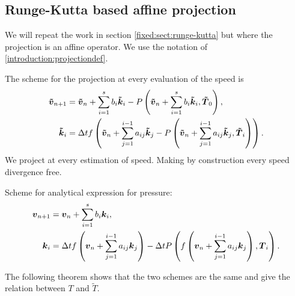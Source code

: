 \subsection{Runge-Kutta based affine projection}
\label{fixed:sect:runge-kutta:affine}
We will repeat the work in section \ref{fixed:sect:runge-kutta} but where the projection is an affine operator.
We use the notation of \ref{introduction:projectiondef}.

The scheme for the projection at every evaluation of the speed is
\begin{subequations}
\begin{align}
{\boldsymbol {\tilde{v}}}_{n+1}&={\boldsymbol {\tilde{v}}}_{n}+\sum_{i=1}^{s}b_{i}{\boldsymbol {\tilde{k}}}_{i}-P\left({\boldsymbol {\tilde{v}}}_{n}+\sum_{i=1}^{s}b_{i}{\boldsymbol {\tilde{k}}}_{i},{\boldsymbol {\tilde{T}}}_0\right),\\
{\boldsymbol {\tilde{k}}}_{i}&=\Delta t f\left({\boldsymbol {\tilde{v}}}_{n}+\sum_{j=1}^{i-1}a_{ij}{\boldsymbol {\tilde{k}}}_{j}-P\left({\boldsymbol {\tilde{v}}}_{n}+\sum_{j=1}^{i-1}a_{ij}{\boldsymbol {\tilde{k}}}_{j},{\boldsymbol {\tilde{T}}}_i\right)\right).
\end{align}
\end{subequations}
We project at every estimation of speed. Making by construction every speed divergence free.

Scheme for analytical expression for pressure:
\begin{subequations}
\begin{align}
	{\boldsymbol {v}}_{n+1}&={\boldsymbol {v}}_{n}+\sum_{i=1}^{s}b_{i}{\boldsymbol {k}}_{i},\\
	{\boldsymbol {k}}_{i}&=\Delta t f\left({\boldsymbol {v}}_{n}+\sum_{j=1}^{i-1}a_{ij}{\boldsymbol {k}}_{j}\right)-\Delta t P\left(f\left({\boldsymbol {v}}_{n}+\sum_{j=1}^{i-1}a_{ij}{\boldsymbol {k}}_{j}\right),{\boldsymbol {T}}_{i}\right).
\end{align}
\end{subequations}

The following theorem shows that the two schemes are the same and give the relation between $T$ and $\tilde{T}$.

